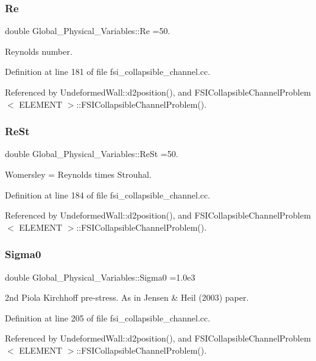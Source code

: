 \subsubsection{\texorpdfstring{Re}{Re}}
{\footnotesize\ttfamily double Global\+\_\+\+Physical\+\_\+\+Variables\+::\+Re =50.}



Reynolds number. 



Definition at line 181 of file fsi\+\_\+collapsible\+\_\+channel.\+cc.



Referenced by Undeformed\+Wall\+::d2position(), and F\+S\+I\+Collapsible\+Channel\+Problem$<$ E\+L\+E\+M\+E\+N\+T $>$\+::\+F\+S\+I\+Collapsible\+Channel\+Problem().

\mbox{\label{namespaceGlobal__Physical__Variables_a085ee4bf968ffdd01a41b8c41864f907}} 
\subsubsection{\texorpdfstring{Re\+St}{ReSt}}
{\footnotesize\ttfamily double Global\+\_\+\+Physical\+\_\+\+Variables\+::\+Re\+St =50.}



Womersley = Reynolds times Strouhal. 



Definition at line 184 of file fsi\+\_\+collapsible\+\_\+channel.\+cc.



Referenced by Undeformed\+Wall\+::d2position(), and F\+S\+I\+Collapsible\+Channel\+Problem$<$ E\+L\+E\+M\+E\+N\+T $>$\+::\+F\+S\+I\+Collapsible\+Channel\+Problem().

\mbox{\label{namespaceGlobal__Physical__Variables_a417dc688a70c4f06ef0faed047068ba2}} 
\subsubsection{\texorpdfstring{Sigma0}{Sigma0}}
{\footnotesize\ttfamily double Global\+\_\+\+Physical\+\_\+\+Variables\+::\+Sigma0 =1.\+0e3}



2nd Piola Kirchhoff pre-\/stress. As in Jensen \& Heil (2003) paper. 



Definition at line 205 of file fsi\+\_\+collapsible\+\_\+channel.\+cc.



Referenced by Undeformed\+Wall\+::d2position(), and F\+S\+I\+Collapsible\+Channel\+Problem$<$ E\+L\+E\+M\+E\+N\+T $>$\+::\+F\+S\+I\+Collapsible\+Channel\+Problem().

